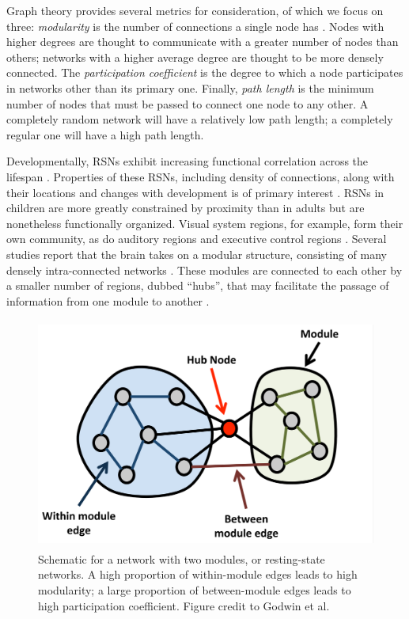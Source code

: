 Graph theory provides several metrics for consideration, of which we focus on three: \textit{modularity} is the number of connections a single node has \citep{Sporns2013}. Nodes with higher degrees are thought to communicate with a greater number of nodes than others; networks with a higher average degree are thought to be more densely connected.  The \textit{participation coefficient} is the degree to which a node participates in networks other than its primary one. Finally, \textit{path length} is the minimum number of nodes that must be passed to connect one node to any other. A completely random network will have a relatively low path length; a completely regular one will have a high path length. 

Developmentally, RSNs exhibit increasing functional correlation across the lifespan \citep{Kesler2013, Uddin2010}. Properties of these RSNs, including density of connections, along with their locations and changes with development is of primary interest  \citep{Cole2014, Dosenbach2007, Fair2009}. RSNs in children are more greatly constrained by proximity than in adults but are nonetheless functionally organized. Visual system regions, for example, form their own community, as do auditory regions and executive control regions \citep{Seeley2007}. Several studies report that the brain takes on a modular structure, consisting of many densely intra-connected networks \citep{Bullmore2009, Fair2009, Supekar2009, Dosenbach2007}. These modules are connected to each other by a smaller number of regions, dubbed ``hubs'', that may facilitate the passage of information from one module to another \citep{Power2013, Bullmore2012}.

\begin{figure}[t]
    \centering
    \includegraphics[height=3in]{images/ch1-graph-schema}
    \caption[Schematic for a network with two modules.]{Schematic for a network with two modules, or resting-state networks. A high proportion of within-module edges leads to high modularity; a large proportion of between-module edges leads to high participation coefficient. Figure credit to Godwin et al. \citep{Godwin2016}}
    \label{fig:ch1-graph-schema}
\end{figure}

